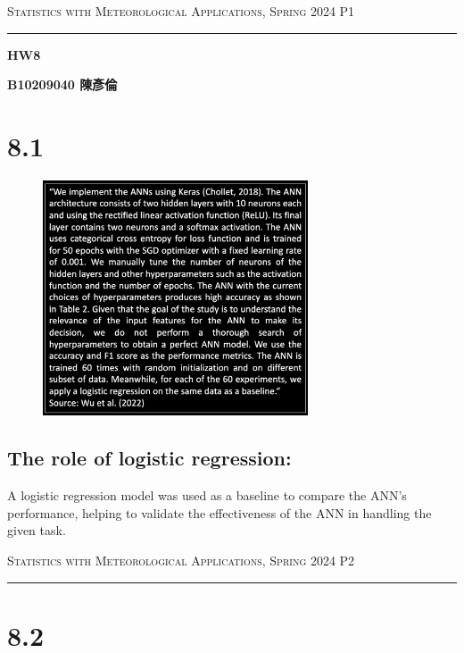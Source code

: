 \documentclass{article}
\author{B10209040 陳彥倫}
\begin{document}
\thispagestyle{empty}
\hfill {\scshape \large Statistics with Meteorological Applications, Spring 2024} \hfill {\scshape P1}
\smallskip
\hrule
\begin{CJK*}{UTF8}{bsmi}
\bigskip
\bigskip
\bigskip

\centerline{\huge \textbf {HW8}}
\bigskip
\centerline{\textbf {B10209040 陳彥倫}}

\bigskip
\bigskip
\bigskip

\section*{8.1}
    \begin{spacing}{2.5}
            \begin{figure}[h]
                \centering
                \includegraphics[width=0.7\textwidth]{1.png}
            \end{figure}
        \subsection*{The role of logistic regression:}
            \begin{large}
                A logistic regression model was used as a baseline to compare the ANN's performance, helping to 
                validate the effectiveness of the ANN in handling the given task.
            \end{large}
    \end{spacing}

\newpage
\thispagestyle{empty}
\hfill {\scshape \large Statistics with Meteorological Applications, Spring 2024} \hfill {\scshape P2}
\smallskip
\hrule
\bigskip
\bigskip
\bigskip


\section*{8.2}
    \begin{spacing}{2.5}
        \begin{large}

\end{large}
\end{spacing}
\end{CJK*}
\end{document}
